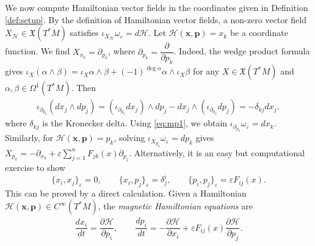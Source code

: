 \documentclass[11pt]{amsart}
\theoremstyle{definition}
\theoremstyle{plain}
\theoremstyle{conclusion}
\begin{document}
We now compute Hamiltonian vector fields in the coordinates given in Definition \ref{def:setup}. By the definition of Hamiltonian vector fields, a non-zero vector field $X_\mathcal{H} \in \mathfrak{X} (T^*M)$ satisfies $\iota_{X_\mathcal{H}} \omega_\varepsilon = d\mathcal{H}$. Let $\mathcal{H}(\textbf{x},\textbf{p}) = x_k$ be a coordinate function. We find $X_{x_k} = \partial_{p_k}$,  where $\partial_{p_k} = \dfrac{\partial}{\partial p_k}$. Indeed, the wedge product formula gives $\iota_X(\alpha \wedge \beta) = \iota_X\alpha \wedge \beta + (-1)^{\deg \alpha} \alpha \wedge \iota_X \beta$ for any $X \in \mathfrak{X}(T^*M)$ and $\alpha,\beta \in \Omega^1(T^*M)$. Then \begin{align*}
    \iota_{\partial_{p_k}}(dx_j \wedge dp_j) = \left(\iota_{\partial_{p_k}} dx_j \right) \wedge d p_j - d x_j \wedge  \left(\iota_{\partial_{p_k}}dp_j\right) = - \delta_{kj} dx_j, 
\end{align*} where $\delta_{kj}$ is the Kronecker delta. Using \eqref{eq:mp1}, we obtain $\iota_{\partial_{p_k}} \omega_{\varepsilon} = dx_k$. Similarly, for $\mathcal{H} (\textbf{x},\textbf{p})= p_k$, solving $\iota_{X_{p_k}} \omega_\varepsilon = d p_k$ gives $X_{p_k} = - \partial_{x_k} +  \varepsilon \sum_{j = 1}^n F_{jk}(x) \partial_{p_j}$. Alternatively, it is an easy but computational exercise to show \cite{MR2141306} $$\{x_i,x_j\}_\varepsilon=0,\qquad\{x_i,p_j\}_\varepsilon=\delta^i_j,\qquad \{p_i,p_j\}_\varepsilon=\varepsilon F_{ij}(x).$$ This can be proved by a direct calculation. Given a Hamiltonian $\mathcal{H}(\textbf{x},\textbf{p}) \in C^\infty(T^*M)$, the \textit{magnetic Hamiltonian equations} are \begin{align}
    \dfrac{d x_i}{dt} = \dfrac{\partial \mathcal{H}}{\partial p_i}, \qquad \dfrac{d p_i}{dt} = - \dfrac{\partial \mathcal{H}}{\partial x_i} +  \varepsilon F_{ij}(x) \dfrac{\partial \mathcal{H}}{\partial p_j}. \label{eq:Hamiltoneq}
\end{align}
\end{document}
